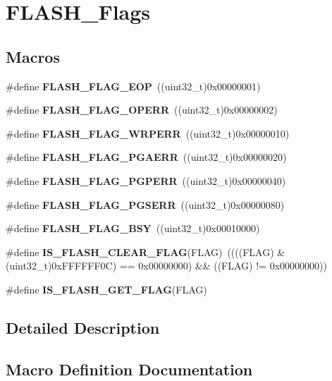 \section{F\+L\+A\+S\+H\+\_\+\+Flags}
\label{group__FLASH__Flags}
\subsection*{Macros}
\begin{DoxyCompactItemize}
\item 
\#define \textbf{ F\+L\+A\+S\+H\+\_\+\+F\+L\+A\+G\+\_\+\+E\+OP}~((uint32\+\_\+t)0x00000001)
\item 
\#define \textbf{ F\+L\+A\+S\+H\+\_\+\+F\+L\+A\+G\+\_\+\+O\+P\+E\+RR}~((uint32\+\_\+t)0x00000002)
\item 
\#define \textbf{ F\+L\+A\+S\+H\+\_\+\+F\+L\+A\+G\+\_\+\+W\+R\+P\+E\+RR}~((uint32\+\_\+t)0x00000010)
\item 
\#define \textbf{ F\+L\+A\+S\+H\+\_\+\+F\+L\+A\+G\+\_\+\+P\+G\+A\+E\+RR}~((uint32\+\_\+t)0x00000020)
\item 
\#define \textbf{ F\+L\+A\+S\+H\+\_\+\+F\+L\+A\+G\+\_\+\+P\+G\+P\+E\+RR}~((uint32\+\_\+t)0x00000040)
\item 
\#define \textbf{ F\+L\+A\+S\+H\+\_\+\+F\+L\+A\+G\+\_\+\+P\+G\+S\+E\+RR}~((uint32\+\_\+t)0x00000080)
\item 
\#define \textbf{ F\+L\+A\+S\+H\+\_\+\+F\+L\+A\+G\+\_\+\+B\+SY}~((uint32\+\_\+t)0x00010000)
\item 
\#define \textbf{ I\+S\+\_\+\+F\+L\+A\+S\+H\+\_\+\+C\+L\+E\+A\+R\+\_\+\+F\+L\+AG}(F\+L\+AG)~((((F\+L\+AG) \& (uint32\+\_\+t)0x\+F\+F\+F\+F\+F\+F0\+C) == 0x00000000) \&\& ((\+F\+L\+A\+G) != 0x00000000))
\item 
\#define \textbf{ I\+S\+\_\+\+F\+L\+A\+S\+H\+\_\+\+G\+E\+T\+\_\+\+F\+L\+AG}(F\+L\+AG)
\end{DoxyCompactItemize}


\subsection{Detailed Description}


\subsection{Macro Definition Documentation}
\mbox{\label{group__FLASH__Flags_gad3bc368f954ad7744deda3315da2fff7}} 
